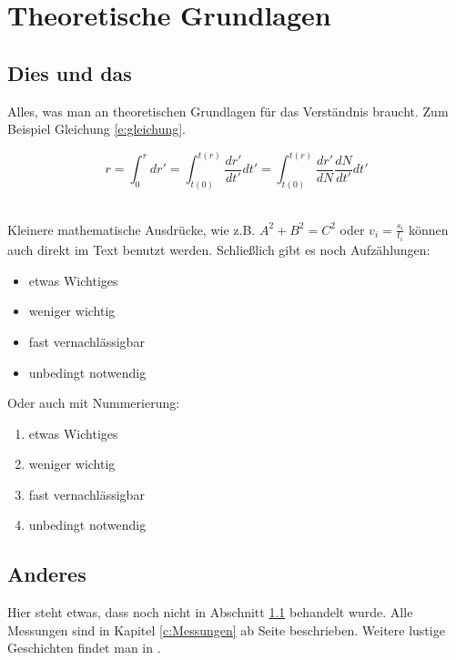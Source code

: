 \chapter{Theoretische Grundlagen}
\section{Dies und das}
\label{s:diesunddas}
Alles, was man an theoretischen Grundlagen f\"ur das Verst\"andnis braucht. Zum Beispiel Gleichung \ref{e:gleichung}.

\begin{center}
\begin{equation}
\label{e:gleichung}
r = \int_{0}^{r} dr' = \int_{t(0)}^{t(r)}\frac{dr'}{dt'}dt' = \int_{t(0)}^{t(r)}\frac{dr'}{dN}\frac{dN}{dt'}dt'
\end{equation} 
\end{center}
\ \\ %

\noindent %
Kleinere mathematische Ausdr\"ucke, wie z.B. $A^{2}+B^{2}=C^{2}$ oder $v_{i}=\frac{s_{i}}{t_{i}}$ k\"onnen auch direkt
im Text benutzt werden. Schlie\ss lich gibt es noch Aufz\"ahlungen:

\begin{itemize}
\item etwas Wichtiges
\item weniger wichtig
\item fast vernachl\"assigbar
\item unbedingt notwendig
\end{itemize}

\noindent
Oder auch mit Nummerierung:

\begin{enumerate}
\item etwas Wichtiges
\item weniger wichtig
\item fast vernachl\"assigbar
\item unbedingt notwendig
\end{enumerate}


\section{Anderes}
\label{s:anderes}
Hier steht etwas, dass noch nicht in Abschnitt \ref{s:diesunddas} behandelt wurde. Alle Messungen sind in Kapitel \ref{c:Messungen} ab Seite \pageref{c:Messungen} beschrieben. Weitere lustige Geschichten findet man in \cite{b:feynman}.